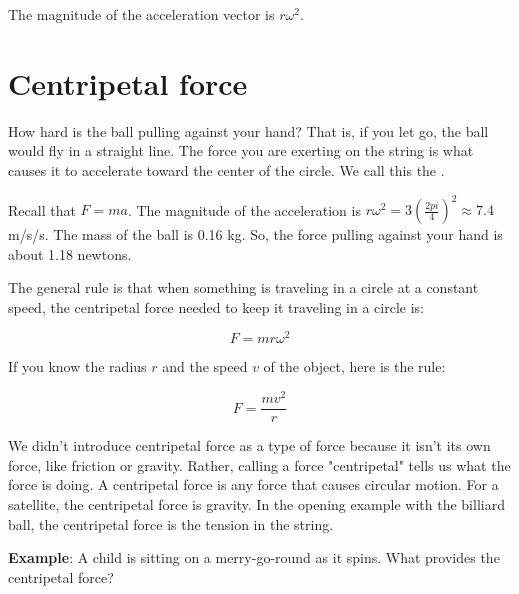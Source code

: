 
The magnitude of the acceleration vector is $r \omega^2$.

\section{Centripetal force}

How hard is the ball pulling against your hand?  That is, if you let
go, the ball would fly in a straight line.  The force you are exerting
on the string is what causes it to accelerate toward the center of the
circle. We call this the .

Recall that $F = m a$.  The magnitude of the acceleration is $r
\omega^2 = 3 \left(\frac{2 pi}{4}\right)^2 \approx 7.4$ m/s/s.  The mass
of the ball is 0.16 kg.  So, the force pulling against your hand is
about 1.18 newtons.

The general rule is that when something is traveling in a circle at a
constant speed, the centripetal force needed to keep it traveling in a
circle is:

$$F = m r \omega^2$$

If you know the radius $r$ and the speed $v$ of the object, here is the rule:

$$F = \frac{m v^2}{r}$$

We didn't introduce centripetal force as a type of force because it isn't its own force, like friction or gravity. Rather, calling a force "centripetal" tells us what the force is doing. A centripetal force is any force that causes circular motion. For a satellite, the centripetal force is gravity. In the opening example with the billiard ball, the centripetal force is the tension in the string. 

\textbf{Example}: A child is sitting on a merry-go-round as it spins. What provides the centripetal force? 

